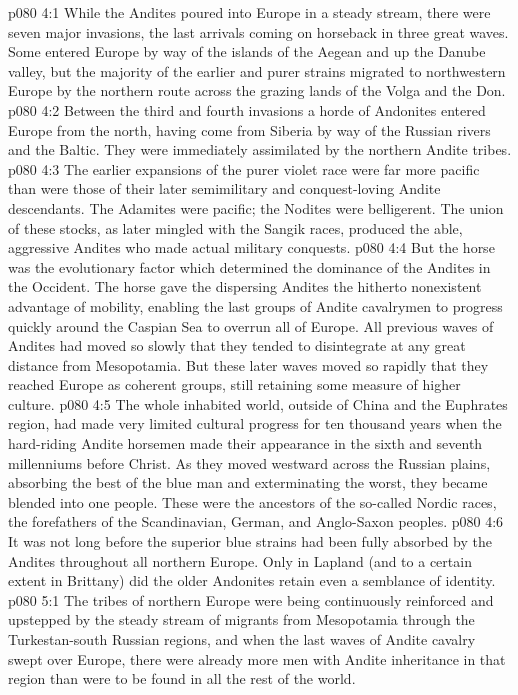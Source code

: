 \vs p080 4:1 While the Andites poured into Europe in a steady stream, there were seven major invasions, the last arrivals coming on horseback in three great waves. Some entered Europe by way of the islands of the Aegean and up the Danube valley, but the majority of the earlier and purer strains migrated to northwestern Europe by the northern route across the grazing lands of the Volga and the Don.
\vs p080 4:2 Between the third and fourth invasions a horde of Andonites entered Europe from the north, having come from Siberia by way of the Russian rivers and the Baltic. They were immediately assimilated by the northern Andite tribes.
\vs p080 4:3 The earlier expansions of the purer violet race were far more pacific than were those of their later semimilitary and conquest\hyp{}loving Andite descendants. The Adamites were pacific; the Nodites were belligerent. The union of these stocks, as later mingled with the Sangik races, produced the able, aggressive Andites who made actual military conquests.
\pc \vs p080 4:4 But the horse was the evolutionary factor which determined the dominance of the Andites in the Occident. The horse gave the dispersing Andites the hitherto nonexistent advantage of mobility, enabling the last groups of Andite cavalrymen to progress quickly around the Caspian Sea to overrun all of Europe. All previous waves of Andites had moved so slowly that they tended to disintegrate at any great distance from Mesopotamia. But these later waves moved so rapidly that they reached Europe as coherent groups, still retaining some measure of higher culture.\plusone
\vs p080 4:5 The whole inhabited world, outside of China and the Euphrates region, had made very limited cultural progress for ten thousand years when the hard\hyp{}riding Andite horsemen made their appearance in the sixth and seventh millenniums before Christ. As they moved westward across the Russian plains, absorbing the best of the blue man and exterminating the worst, they became blended into one people. These were the ancestors of the so\hyp{}called Nordic races, the forefathers of the Scandinavian, German, and Anglo\hyp{}Saxon peoples.
\pc \vs p080 4:6 It was not long before the superior blue strains had been fully absorbed by the Andites throughout all northern Europe. Only in Lapland (and to a certain extent in Brittany) did the older Andonites retain even a semblance of identity.
\vs p080 5:1 The tribes of northern Europe were being continuously reinforced and upstepped by the steady stream of migrants from Mesopotamia through the Turkestan\hyp{}south Russian regions, and when the last waves of Andite cavalry swept over Europe, there were already more men with Andite inheritance in that region than were to be found in all the rest of the world.
